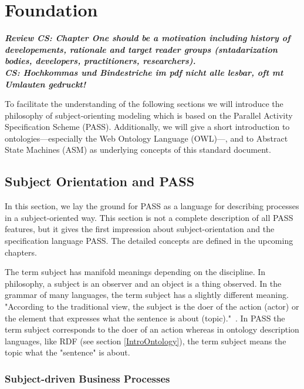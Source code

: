 

\chapter{Foundation}

\emph{\textit{\textbf{Review CS: Chapter One should be a motivation including history of developements, \newline rationale and target reader groups (sntadarization bodies, developers, practitioners, researchers).\\
CS: Hochkommas und Bindestriche im pdf nicht alle lesbar, oft mt Umlauten gedruckt!}}}

To facilitate the understanding of the following sections we will introduce the philosophy of subject-orienting modeling which is based on the Parallel Activity Specification Scheme (PASS). Additionally, we will give a short introduction to ontologies---especially the Web Ontology Language (OWL)---, and to Abstract State Machines (ASM) as underlying concepts of this standard document.

\section{Subject Orientation and PASS }
\label{SubjectOrient}


In this section, we lay the ground for PASS as a language for describing processes in a subject-oriented way. This section is not a complete description of all PASS features, but it gives the first impression about subject-orientation and the specification language PASS. The detailed concepts are defined in the upcoming chapters.

The term subject has manifold meanings depending on the discipline. In philosophy, a subject is an observer and an object is a thing observed. In the grammar of many languages, the term subject has a slightly different meaning. "According to the traditional view, the subject is the doer of the action (actor) or the element that expresses what the sentence is about (topic)."~\cite{Keenan:1976aa}. In PASS the term subject corresponds to the doer of an action whereas in ontology description languages, like RDF (see section \ref{IntroOntology}), the term subject means the topic what the "sentence" is about.

\subsection{Subject-driven Business Processes}

